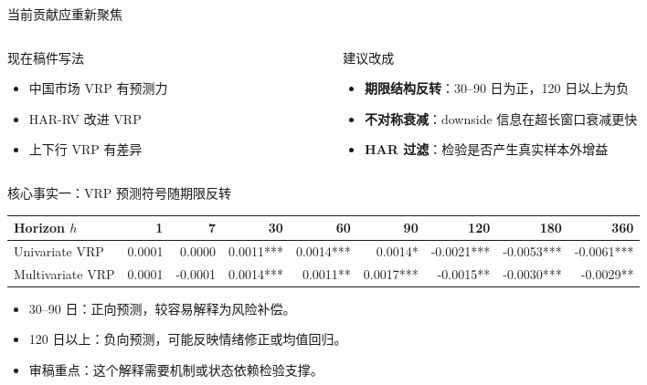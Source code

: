 \documentclass[UTF8,aspectratio=169]{ctexbeamer}
\begin{document}
\begin{frame}{当前贡献应重新聚焦}
  \begin{columns}[T,totalwidth=\linewidth]
    \begin{column}{0.48\linewidth}
      \begin{block}{现在稿件写法}
        \begin{itemize}
          \item 中国市场 VRP 有预测力
          \item HAR-RV 改进 VRP
          \item 上下行 VRP 有差异
        \end{itemize}
      \end{block}
    \end{column}
    \begin{column}{0.48\linewidth}
      \begin{block}{建议改成}
        \begin{itemize}
          \item \textbf{期限结构反转}：30--90 日为正，120 日以上为负
          \item \textbf{不对称衰减}：downside 信息在超长窗口衰减更快
          \item \textbf{HAR 过滤}：检验是否产生真实样本外增益
        \end{itemize}
      \end{block}
    \end{column}
  \end{columns}
\end{frame}

\begin{frame}{核心事实一：VRP 预测符号随期限反转}
  \small
  \begin{tabular}{lrrrrrrrr}
    \toprule
    Horizon $h$ & 1 & 7 & 30 & 60 & 90 & 120 & 180 & 360 \\
    \midrule
    Univariate VRP
      & 0.0001 & 0.0000 & 0.0011*** & 0.0014*** & 0.0014* & -0.0021*** & -0.0053*** & -0.0061*** \\
    Multivariate VRP
      & 0.0001 & -0.0001 & 0.0014*** & 0.0011** & 0.0017*** & -0.0015** & -0.0030*** & -0.0029** \\
    \bottomrule
  \end{tabular}

  \vspace{0.35cm}
  \begin{itemize}
    \item 30--90 日：正向预测，较容易解释为风险补偿。
    \item 120 日以上：负向预测，可能反映情绪修正或均值回归。
    \item 审稿重点：这个解释需要机制或状态依赖检验支撑。
  \end{itemize}
\end{frame}
\end{document}
